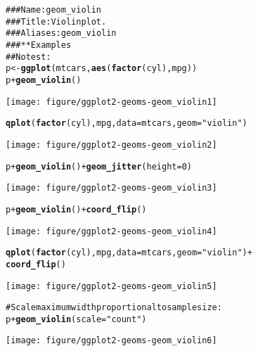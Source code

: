 \documentclass[a4paper,titlepage]{tufte-handout}\usepackage{graphicx, color}
\makeatletter
\def\maxwidth{ %
  \ifdim\Gin@nat@width>\linewidth
    \linewidth
  \else
    \Gin@nat@width
  \fi
}
\newcommand{\hlfunctioncall}[1]{\textcolor[rgb]{0.501960784313725,0,0.329411764705882}{\textbf{#1}}}%
\newcommand{\hlstring}[1]{\textcolor[rgb]{0.6,0.6,1}{#1}}%
\newcommand{\hlcomment}[1]{\textcolor[rgb]{0.180392156862745,0.6,0.341176470588235}{#1}}%
\newenvironment{kframe}{%
 \def\at@end@of@kframe{}%
 \ifinner\ifhmode%
  \def\at@end@of@kframe{\end{minipage}}%
  \begin{minipage}{\columnwidth}%
 \fi\fi%
 \def\FrameCommand##1{\hskip\@totalleftmargin \hskip-\fboxsep
 \colorbox{shadecolor}{##1}\hskip-\fboxsep
     \hskip-\linewidth \hskip-\@totalleftmargin \hskip\columnwidth}%
 \MakeFramed {\advance\hsize-\width
   \@totalleftmargin\z@ \linewidth\hsize
   \@setminipage}}%
 {\par\unskip\endMakeFramed%
 \at@end@of@kframe}
\newenvironment{knitrout}{}{} %
\makeatother
\begin{document}
\begin{knitrout}
\color{fgcolor}\begin{kframe}
\begin{alltt}
\hlcomment{### Name: geom_violin}
\hlcomment{### Title: Violin plot.}
\hlcomment{### Aliases: geom_violin}
\hlcomment{### ** Examples}
\hlcomment{## No test: }
p <- \hlfunctioncall{ggplot}(mtcars, \hlfunctioncall{aes}(\hlfunctioncall{factor}(cyl), mpg))
p + \hlfunctioncall{geom_violin}()
\end{alltt}
\end{kframe}\texttt{[image: figure/ggplot2-geoms-geom\_violin1]} \begin{kframe}\begin{alltt}
\hlfunctioncall{qplot}(\hlfunctioncall{factor}(cyl), mpg, data = mtcars, geom = \hlstring{"violin"})
\end{alltt}
\end{kframe}\texttt{[image: figure/ggplot2-geoms-geom\_violin2]} \begin{kframe}\begin{alltt}
p + \hlfunctioncall{geom_violin}() + \hlfunctioncall{geom_jitter}(height = 0)
\end{alltt}
\end{kframe}\texttt{[image: figure/ggplot2-geoms-geom\_violin3]} \begin{kframe}\begin{alltt}
p + \hlfunctioncall{geom_violin}() + \hlfunctioncall{coord_flip}()
\end{alltt}
\end{kframe}\texttt{[image: figure/ggplot2-geoms-geom\_violin4]} \begin{kframe}\begin{alltt}
\hlfunctioncall{qplot}(\hlfunctioncall{factor}(cyl), mpg, data = mtcars, geom = \hlstring{"violin"}) +
  \hlfunctioncall{coord_flip}()
\end{alltt}
\end{kframe}\texttt{[image: figure/ggplot2-geoms-geom\_violin5]} \begin{kframe}\begin{alltt}
\hlcomment{# Scale maximum width proportional to sample size:}
p + \hlfunctioncall{geom_violin}(scale = \hlstring{"count"})
\end{alltt}
\end{kframe}\texttt{[image: figure/ggplot2-geoms-geom\_violin6]} \begin{kframe}\begin{alltt}

\end{alltt}
\end{kframe}
\end{knitrout}
\end{document}
